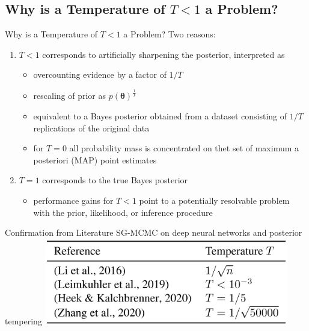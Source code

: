 \documentclass[mathserif,dvipsnames,table,xcdraw]{beamer}
\begin{document}
\subsection[Why is a Temperature of $T < 1$ a Problem? ]{Why is a Temperature of $T < 1$ a Problem?}
	\begin{frame}{Why is a Temperature of $T < 1$ a Problem?}
		Two reasons:
		\begin{enumerate}
			\item<1-> $T<1$ corresponds to artificially sharpening the posterior, interpreted as
			\begin{itemize}
				\item<1-> overcounting evidence by a factor of $1/T$
				\item<2-> rescaling of prior as $p(\bm{\theta})^{\frac{1}{T}}$
				\item<3-> equivalent to a Bayes posterior obtained from a dataset consisting of $1/T$ replications of the original data
				\item<4-> for $T=0$ all probability mass is concentrated on thet set of maximum a posteriori (MAP) point estimates
			\end{itemize}
			\item<5-> $T=1$ corresponds to the true Bayes posterior 
			\begin{itemize}
				\item performance gains for $T<1$ point to a potentially resolvable problem with the prior, likelihood, or inference procedure
			\end{itemize} 
		\end{enumerate}
	\end{frame}

	\begin{frame}{Confirmation from Literature}
		{SG-MCMC on deep neural networks and posterior tempering}
		\centering
		\includegraphics[width=0.8\textwidth]{../figures/lit_1.png}
	\end{frame}
\end{document}
